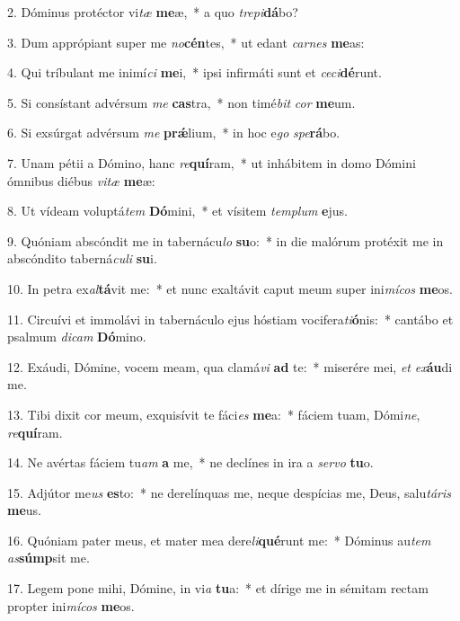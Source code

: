 2. Dóminus protéctor vi\textit{tæ} \textbf{me}æ,~*  a quo \textit{tre}\textit{pi}\textbf{dá}bo?\

3. Dum apprópiant super me \textit{no}\textbf{cén}tes,~*  ut edant \textit{car}\textit{nes} \textbf{me}as:\

4. Qui tríbulant me inimí\textit{ci} \textbf{me}i,~*  ipsi infirmáti sunt et \textit{ce}\textit{ci}\textbf{dé}runt.\

5. Si consístant advérsum \textit{me} \textbf{cas}tra,~*  non timé\textit{bit} \textit{cor} \textbf{me}um.\

6. Si exsúrgat advérsum \textit{me} \textbf{prǽ}lium,~*  in hoc e\textit{go} \textit{spe}\textbf{rá}bo.\

7. Unam pétii a Dómino, hanc \textit{re}\textbf{quí}ram,~*  ut inhábitem in domo Dómini ómnibus diébus \textit{vi}\textit{tæ} \textbf{me}æ:\

8. Ut vídeam voluptá\textit{tem} \textbf{Dó}mini,~*  et vísitem \textit{tem}\textit{plum} \textbf{e}jus.\

9. Quóniam abscóndit me in tabernácu\textit{lo} \textbf{su}o:~*  in die malórum protéxit me in abscóndito taberná\textit{cu}\textit{li} \textbf{su}i.\

10. In petra ex\textit{al}\textbf{tá}vit me:~*  et nunc exaltávit caput meum super ini\textit{mí}\textit{cos} \textbf{me}os.\

11. Circuívi et immolávi in tabernáculo ejus hóstiam vocifera\textit{ti}\textbf{ó}nis:~*  cantábo et psalmum \textit{di}\textit{cam} \textbf{Dó}mino.\

12. Exáudi, Dómine, vocem meam, qua clamá\textit{vi} \textbf{ad} te:~*  miserére mei, \textit{et} \textit{ex}\textbf{áu}di me.\

13. Tibi dixit cor meum, exquisívit te fáci\textit{es} \textbf{me}a:~*  fáciem tuam, Dómi\textit{ne}, \textit{re}\textbf{quí}ram.\

14. Ne avértas fáciem tu\textit{am} \textbf{a} me,~*  ne declínes in ira a \textit{ser}\textit{vo} \textbf{tu}o.\

15. Adjútor me\textit{us} \textbf{es}to:~*  ne derelínquas me, neque despícias me, Deus, salu\textit{tá}\textit{ris} \textbf{me}us.\

16. Quóniam pater meus, et mater mea dere\textit{li}\textbf{qué}runt me:~*  Dóminus au\textit{tem} \textit{as}\textbf{súmp}sit me.\

17. Legem pone mihi, Dómine, in vi\textit{a} \textbf{tu}a:~*  et dírige me in sémitam rectam propter ini\textit{mí}\textit{cos} \textbf{me}os.\

